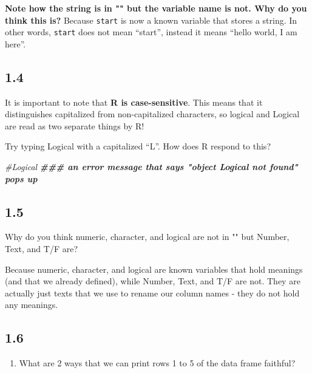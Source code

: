 \documentclass[
]{book}
\newenvironment{Shaded}{\begin{snugshade}}{\end{snugshade}}
\newcommand{\CommentTok}[1]{\textcolor[rgb]{0.56,0.35,0.01}{\textit{#1}}}
\newcommand{\DocumentationTok}[1]{\textcolor[rgb]{0.56,0.35,0.01}{\textbf{\textit{#1}}}}
\providecommand{\tightlist}{%
  \setlength{\itemsep}{0pt}\setlength{\parskip}{0pt}}
\begin{document}
\textbf{Note how the string is in "" but the variable name is not. Why do you think this is?}
Because \texttt{start} is now a known variable that stores a string. In other words, \texttt{start} does not mean ``start'', instead it means ``hello world, I am here''.

\hypertarget{section-3}{%
\subsection{1.4}\label{section-3}}

It is important to note that \textbf{R is case-sensitive}. This means that it distinguishes capitalized from non-capitalized characters, so logical and Logical are read as two separate things by R!

Try typing Logical with a capitalized ``L''. How does R respond to this?

\begin{Shaded}
\begin{Highlighting}[]
\CommentTok{\#Logical}
    \DocumentationTok{\#\#\# an error message that says "object \textquotesingle{}Logical\textquotesingle{} not found" pops up}
\end{Highlighting}
\end{Shaded}

\hypertarget{section-4}{%
\subsection{1.5}\label{section-4}}

Why do you think numeric, character, and logical are not in "" but Number, Text, and T/F are?

Because numeric, character, and logical are known variables that hold meanings (and that we already defined), while Number, Text, and T/F are not. They are actually just texts that we use to rename our column names - they do not hold any meanings.

\hypertarget{section-5}{%
\subsection{1.6}\label{section-5}}

\begin{enumerate}
\def\labelenumi{\arabic{enumi}.}
\tightlist
\item
  What are 2 ways that we can print rows 1 to 5 of the data frame faithful?
\end{enumerate}
\end{document}
